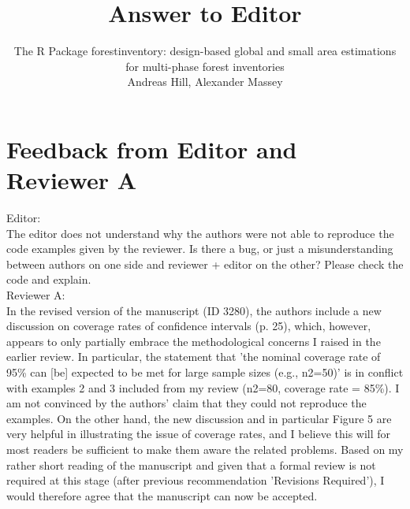 \documentclass{article}
\title{Answer to Editor}
\author{The R Package forestinventory: design-based global and small area estimations for multi-phase forest inventories\\
Andreas Hill, Alexander Massey}
\begin{document}



\maketitle
\thispagestyle{empty}
\newpage

\setcounter{page}{1}

\pagestyle{fancy} %
\fancyfoot[C]{\thepage}
\setlength{\headsep}{15mm}

\newcommand{\answer}[1]{\small \color{mybrown}{#1} \color{black}}
\newcommand{\note}[1]{\textit{\small \color{amaranth} \textbf{Note:} #1} \color{black}}
\newcommand{\todo}[1]{\color{red}{#1} \color{black}}
\newcommand{\answerfin}[1]{\small \color{mygreen}{#1} \color{black}}
\newcommand{\code}[1]{\texttt{#1}}



\section*{Feedback from Editor and Reviewer A}

Editor:\\
The editor does not understand why the authors were not able to reproduce the code examples given by the reviewer. Is there a bug, or just a misunderstanding between authors on one side and reviewer + editor on the other? Please check the code and explain.\\

Reviewer A:\\
In the revised version of the manuscript (ID 3280), the authors include a new discussion on coverage rates of confidence intervals (p. 25), which, however, appears to only partially embrace the methodological concerns I raised in the earlier review. In particular, the statement that 'the nominal coverage rate of 95\% can [be] expected to be met for large sample sizes (e.g., n2=50)' is in conflict with examples 2 and 3 included from my review (n2=80, coverage rate = 85\%). I am not convinced by the authors' claim that they could not reproduce the examples. On the other hand, the new discussion and in particular Figure 5 are very helpful in illustrating the issue of coverage rates, and I believe this will for most readers be sufficient to make them aware the related problems. Based on my rather short reading of the manuscript and given that a formal review is not required at this stage (after previous recommendation 'Revisions Required'), I would therefore agree that the manuscript can now be accepted.
\end{document}
